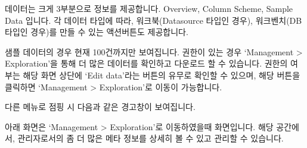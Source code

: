 \documentclass[letterpaper,10pt,english]{sphinxmanual}
\begin{document}
데이터는 크게 3부분으로 정보를 제공합니다. Overview, Column Scheme, Sample Data 입니다.
각 데이터 타입에 따라, 워크북(Datasource 타입인 경우), 워크벤치(DB 타입인 경우)를 만들 수 있는 액션버튼도 제공합니다.
\begin{quote}

\begin{figure}[H]
\centering

\noindent{}
\end{figure}
\end{quote}

샘플 데이터의 경우 현재 100건까지만 보여집니다. 권한이 있는 경우 ‘Management \textgreater{} Exploration’을 통해 더 많은 데이터를 확인하고 다운로드 할 수 있습니다.
권한의 여부는 해당 화면 상단에 ‘Edit data’라는 버튼의 유무로 확인할 수 있으며, 해당 버튼을 클릭하면 ‘Management \textgreater{} Exploration’로 이동이 가능합니다.
\begin{quote}

\begin{figure}[H]
\centering

\noindent{}
\end{figure}
\end{quote}

다른 메뉴로 점핑 시 다음과 같은 경고창이 보여집니다.
\begin{quote}

\begin{figure}[H]
\centering

\noindent{}
\end{figure}
\end{quote}

아래 화면은 ‘Management \textgreater{} Exploration’로 이동하였을때 화면입니다. 해당 공간에서, 관리자로서의 좀 더 많은 메타 정보를 상세히 볼 수 있고 관리할 수 있습니다.
\begin{quote}

\begin{figure}[H]
\centering

\noindent{}
\end{figure}

\begin{figure}[H]
\centering

\noindent{}
\end{figure}
\end{quote}
\end{document}
